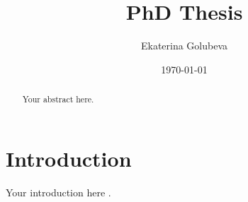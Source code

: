 \documentclass{article}
\title{PhD Thesis}
\author{Ekaterina Golubeva}
\date{\today}
\begin{document}
\maketitle

\begin{abstract}
Your abstract here.
\end{abstract}

\section{Introduction}
Your introduction here \cite{example}.



\end{document}
